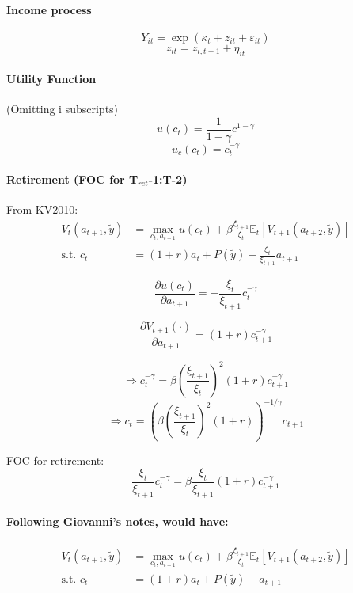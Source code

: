 \documentclass[11pt]{article}
\begin{document}
\paragraph*{Income process}
$$ Y_{i t} =  \exp( \kappa_t + z_{i t} + \varepsilon_{i t})$$
$$ z_{i t} = z_{i,t-1} + \eta_{i t} $$


\paragraph*{Utility Function}
(Omitting i subscripts)
$$ u(c_t) = \frac{1}{1-\gamma} c^{1-\gamma} $$
$$ u_c(c_t) = c_t^{-\gamma} $$

\paragraph*{Retirement (FOC for T$_{ret}$-1:T-2)}

From KV2010:
\begin{equation*}
\begin{split}
 V_{t}(a_{t+1}, \tilde{y}) &= \max_{c_t,a_{t+1}} u(c_{t}) + \beta \frac{\xi_{t+1}}{\xi_{t}} \mathbb{E}_t[V_{t+1}(a_{t+2}, \tilde{y})] \\
  \text{s.t. } c_t &= (1+r) a_{t}+P(\tilde{y}) - \frac{\xi_{t}}{\xi_{t+1}} a_{t+1}
\end{split}
\end{equation*}

$$ \frac{\partial{u(c_t)}}{\partial{a_{t+1}}} = -\frac{\xi_t}{\xi_{t+1}} c_t^{-\gamma} $$

$$ \frac{\partial{V_{t+1}(\cdot)}}{\partial{a_{t+1}}} = (1+r) c_{t+1}^{-\gamma} $$

$$ \Rightarrow c_t^{-\gamma} = \beta \left(
    \frac{\xi_{t+1}}{\xi_t} \right) ^2 (1+r) c_{t+1}^{-\gamma} $$
$$ \Rightarrow c_t = \left(\beta \left(
    \frac{\xi_{t+1}}{\xi_t} \right) ^2 (1+r) \right)^{-1/\gamma} c_{t+1} $$

FOC for retirement:
$$ \frac{\xi_t}{\xi_{t+1}} c_t^{-\gamma} = \beta \frac{\xi_t}{\xi_{t+1}} (1+r) c_{t+1}^{-\gamma} $$


\paragraph*{Following Giovanni's notes, would have:}
\begin{equation*}
\begin{split}
 V_{t}(a_{t+1}, \tilde{y}) &= \max_{c_t,a_{t+1}} u(c_{t}) + \beta \frac{\xi_{t+1}}{\xi_{t}} \mathbb{E}_t[V_{t+1}(a_{t+2}, \tilde{y})] \\
 \text{s.t. } c_t &= (1+r) a_{t}+P(\tilde{y}) - a_{t+1}
\end{split}
\end{equation*}
\end{document}
